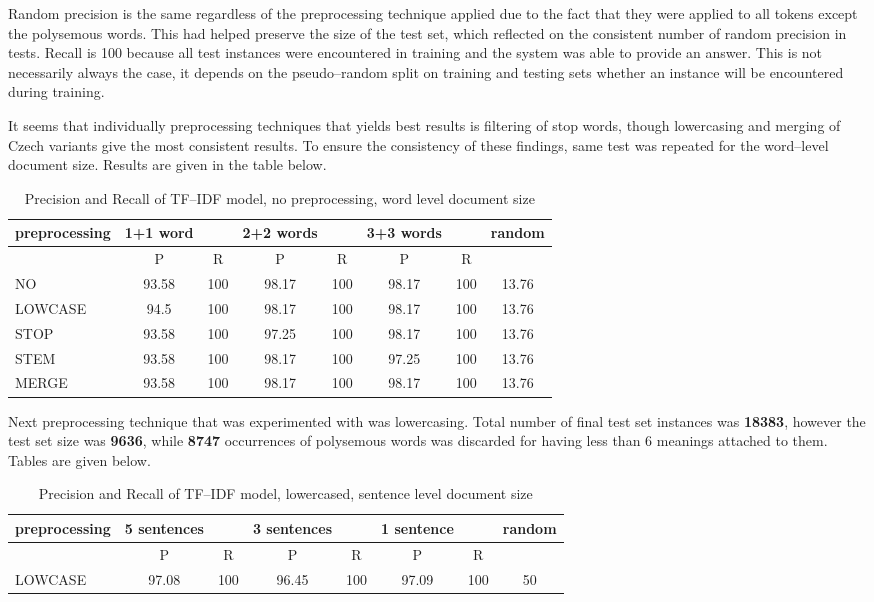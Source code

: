 Random precision is the same regardless of the preprocessing technique applied due to the fact that 
they were applied to all tokens except the polysemous words. This had helped preserve the size of the 
test set, which reflected on the consistent number of random precision in tests. Recall is 100 because all test instances were encountered in training and the system was able to
provide an answer. This is not necessarily always the case, it depends on the pseudo--random split on 
training and testing sets  whether an instance will be encountered during training. 

It seems that individually 
 preprocessing techniques that yields best results is filtering of stop words, though lowercasing and merging of Czech variants give the most consistent results. To ensure the consistency of these findings, same test was repeated for the word--level document size. Results are given in the table below.  
\begin{table}[h!]
\begin{tabular}{ l | c c | c c | c c | c}
   preprocessing & 1+1 word && 2+2 words && 3+3 words  && random\\
\hline\hline
	& P  &  R & P  &  R & P  &  R &\\
\hline
 NO  & 93.58 & 100 & 98.17 & 100 & 98.17 & 100 & 13.76 \\
LOWCASE  & 94.5 & 100 & 98.17 & 100 & 98.17 & 100 & 13.76  \\
STOP  & 93.58 & 100 & 97.25 & 100 & 98.17 & 100 & 13.76  \\
STEM  & 93.58 & 100 & 98.17 & 100 & 97.25 & 100 & 13.76 \\
MERGE  & 93.58 & 100 & 98.17 & 100 & 98.17 & 100 & 13.76  \\
\end{tabular}
\caption{Precision and Recall of TF--IDF model, no preprocessing, word level document size}
\end{table}




Next preprocessing technique that was experimented with was lowercasing. Total number of final test set instances was \textbf{18383}, however the test set size was \textbf{9636}, while \textbf{8747} occurrences of polysemous words was discarded  for having less than 6 meanings attached to them. Tables are given below.
\begin{table}[h!]
\begin{tabular}{ l | c c | c c | c c | c}
   preprocessing &  5 sentences && 3 sentences && 1 sentence  && random\\
\hline
	& P  &  R & P  &  R & P  &  R &\\
\hline\hline
LOWCASE  & 97.08 & 100 & 96.45 & 100 & 97.09 & 100 & 50 \\
\end{tabular}
\caption{Precision and Recall of TF--IDF model, lowercased, sentence level document size}
\end{table}

